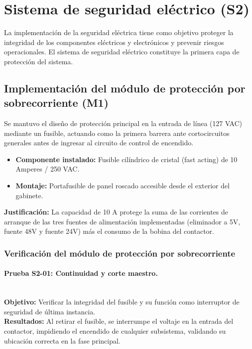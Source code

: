 \section{Sistema de seguridad eléctrico (S2)}

La implementación de la seguridad eléctrica tiene como objetivo proteger la integridad de los componentes eléctricos y electrónicos y prevenir riesgos operacionales. El sistema de seguridad eléctrico constituye la primera capa de protección del sistema.

\subsection{Implementación del módulo de protección por sobrecorriente (M1)}
Se mantuvo el diseño de protección principal en la entrada de línea (127 VAC) mediante un fusible, actuando como la primera barrera ante cortocircuitos generales antes de ingresar al circuito de control de encendido.

\begin{itemize}
	\item \textbf{Componente instalado:} Fusible cilíndrico de cristal (fast acting) de 10 Amperes / 250 VAC.
	\item \textbf{Montaje:} Portafusible de panel roscado accesible desde el exterior del gabinete.
\end{itemize}

\textbf{Justificación:} La capacidad de 10 A protege la suma de las corrientes de arranque de las tres fuentes de alimentación implementadas (eliminador a 5V, fuente 48V y fuente 24V) más el consumo de la bobina del contactor.

\subsubsection{Verificación del módulo de protección por sobrecorriente}
\paragraph*{Prueba S2-01: Continuidad y corte maestro.}\mbox{}\\
\textbf{Objetivo:} Verificar la integridad del fusible y su función como interruptor de seguridad de última instancia.
\\
\textbf{Resultados:} Al retirar el fusible, se interrumpe el voltaje en la entrada del contactor, impidiendo el encendido de cualquier subsistema, validando su ubicación correcta en la fase principal.

